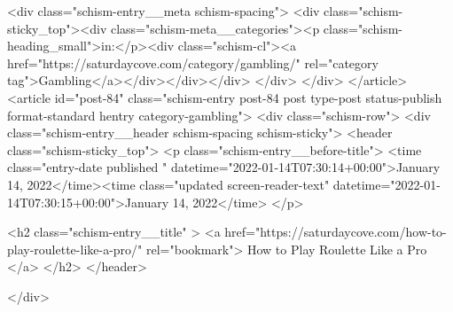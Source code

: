 {		<div class="schism-entry__meta schism-spacing">			<div class="schism-sticky_top"><div class="schism-meta__categories"><p class="schism-heading_small">in:</p><div class="schism-cl"><a href="https://saturdaycove.com/category/gambling/" rel="category tag">Gambling</a></div></div></div>		</div>
	</div>
</article>
<article id="post-84" class="schism-entry post-84 post type-post status-publish format-standard hentry category-gambling">
	<div class="schism-row">		<div class="schism-entry__header schism-spacing schism-sticky">			<header class="schism-sticky_top">				<p class="schism-entry__before-title">
					<time class="entry-date published " datetime="2022-01-14T07:30:14+00:00">January 14, 2022</time><time class="updated screen-reader-text" datetime="2022-01-14T07:30:15+00:00">January 14, 2022</time>				</p>

				<h2 class="schism-entry__title" >
					<a href="https://saturdaycove.com/how-to-play-roulette-like-a-pro/" rel="bookmark">
						How to Play Roulette Like a Pro					</a>
				</h2>
			</header>

					</div>

}
